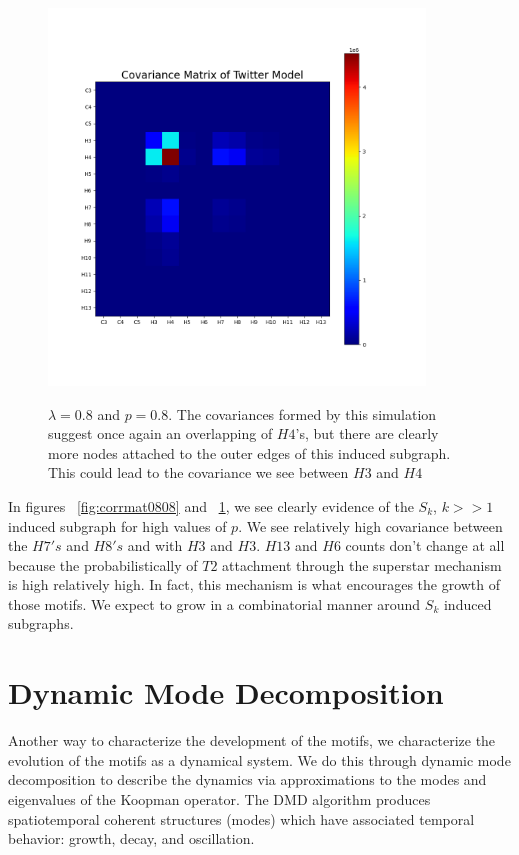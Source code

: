 \begin{figure}
    \includegraphics[width=10cm]{Images/CovMatTwitterModel080809.png}\
    \centering
    \caption{$\lambda=0.8$ and $p=0.8$. The covariances formed by this simulation suggest once again
    an overlapping of $H4$'s, but there are clearly more nodes attached to the outer edges of this
    induced subgraph. This could lead to the covariance we see between $H3$ and $H4$}
    \label{fig:covmat0808}
\end{figure}

\FloatBarrier

In figures ~\ref{fig:corrmat0808} and ~\ref{fig:covmat0808}, we see clearly evidence of the $S_k$, $k>>1$ induced subgraph
for high values of $p$. We see relatively high covariance between the $H7's$ and
$H8's$ and with $H3$ and $H3$. $H13$ and $H6$ counts don't change at all because the probabilistically
of $T2$ attachment through the superstar mechanism is high relatively high. In fact, this 
mechanism is what encourages the growth of those motifs. We expect to grow in a combinatorial manner
 around $S_k$ induced subgraphs.

\chapter{Dynamic Mode Decomposition}
Another way to characterize the development of the motifs, we
characterize the evolution of the motifs as a dynamical system. We do this through
dynamic mode decomposition to describe the dynamics via approximations to the modes and
 eigenvalues of the Koopman operator. The DMD algorithm produces spatiotemporal coherent structures (modes)
which have associated temporal behavior: growth, decay, and oscillation. 

